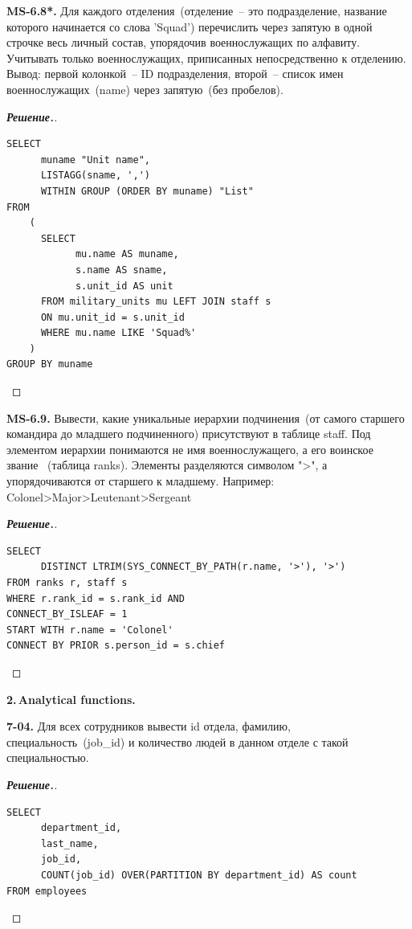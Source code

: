 \documentclass[a4paper]{article}
\newcommand{\MYlvm}{\leavevmode\vspace{-0.3cm}}		%
\begin{document}
\noindent
{\bf MS-6.8*.}
Для каждого отделения~(отделение~-- это подразделение, название которого 
начинается со слова 'Squad') перечислить через запятую в одной строчке весь 
личный состав, упорядочив военнослужащих по алфавиту. 
Учитывать только военнослужащих, приписанных непосредственно к отделению.
Вывод: первой колонкой~-- ID подразделения, второй~-- список имен 
военнослужащих~(name) через запятую~(без пробелов).

\begin{proof}[{\bf Решение.}]\MYlvm\\
\begin{lstlisting}
SELECT 
      muname "Unit name", 
      LISTAGG(sname, ',') 
      WITHIN GROUP (ORDER BY muname) "List"
FROM
    (
      SELECT 
            mu.name AS muname, 
            s.name AS sname, 
            s.unit_id AS unit
      FROM military_units mu LEFT JOIN staff s
      ON mu.unit_id = s.unit_id 
      WHERE mu.name LIKE 'Squad%'
    )
GROUP BY muname 
\end{lstlisting}
\end{proof}


\noindent
{\bf MS-6.9.}
Вывести, какие уникальные иерархии подчинения~(от самого старшего командира до 
младшего подчиненного) присутствуют в таблице staff.
Под элементом иерархии понимаются не имя военнослужащего, а его воинское звание~ 
(таблица ranks). Элементы разделяются символом ">", а упорядочиваются от 
старшего к младшему. Например: Colonel>Major>Leutenant>Sergeant

\begin{proof}[{\bf Решение.}]\MYlvm\\
\begin{lstlisting}
SELECT 
      DISTINCT LTRIM(SYS_CONNECT_BY_PATH(r.name, '>'), '>') 
FROM ranks r, staff s
WHERE r.rank_id = s.rank_id AND 
CONNECT_BY_ISLEAF = 1 
START WITH r.name = 'Colonel'
CONNECT BY PRIOR s.person_id = s.chief 
\end{lstlisting}
\end{proof}




\newpage




\noindent
{\large\bf 2.\,Analytical functions.}

\vspace{.5cm}
\noindent
{\bf 7-04.}
Для всех сотрудников вывести id отдела, фамилию, специальность~(job\_id) и 
количество людей в данном отделе с такой специальностью.

\begin{proof}[{\bf Решение.}]\MYlvm\\
\begin{lstlisting}
SELECT 
      department_id, 
      last_name, 
      job_id,
      COUNT(job_id) OVER(PARTITION BY department_id) AS count
FROM employees
\end{lstlisting}
\end{proof}
\end{document}

